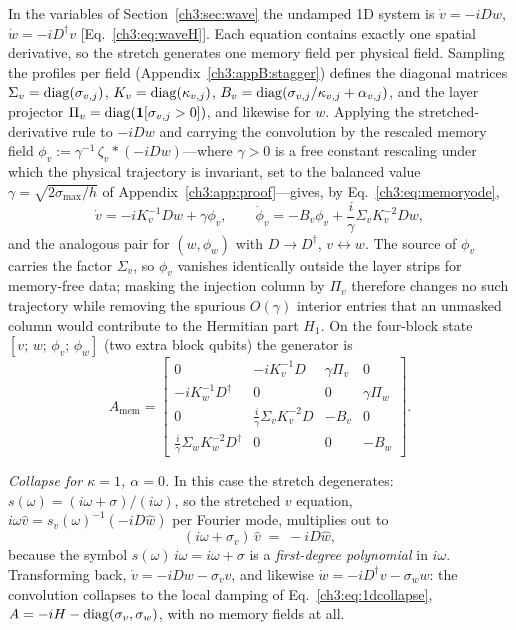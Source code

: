 In the variables of Section~\ref{ch3:sec:wave} the undamped 1D system is
$\dot v=-iDw$, $\dot w=-iD^{\dagger}v$ [Eq.~\eqref{ch3:eq:waveH}].  Each
equation contains exactly one spatial derivative, so the stretch
generates one memory field per physical field.  Sampling the profiles
per field (Appendix~\ref{ch3:appB:stagger}) defines the diagonal matrices
$\Sigma_v=\operatorname{diag}(\sigma_{v,j})$, $K_v=\operatorname{diag}(\kappa_{v,j})$,
$B_v=\operatorname{diag}(\sigma_{v,j}/\kappa_{v,j}+\alpha_{v,j})$, and the layer
projector $\Pi_v=\operatorname{diag}(\mathbf{1}[\sigma_{v,j}>0])$, and likewise for
$w$.  Applying the stretched-derivative rule to $-iDw$ and carrying the
convolution by the rescaled memory field
$\phi_v:=\gamma^{-1}\,\zeta_v*(-iDw)$---where $\gamma>0$ is a free
constant rescaling under which the physical trajectory is invariant,
set to the balanced value $\gamma=\sqrt{2\sigma_{\max}/h}$ of
Appendix~\ref{ch3:app:proof}---gives, by Eq.~\eqref{ch3:eq:memoryode},
\begin{equation}
  \dot v = -iK_v^{-1}Dw + \gamma\phi_v,
  \qquad
  \dot\phi_v = -B_v\phi_v + \frac{i}{\gamma}\Sigma_vK_v^{-2}Dw,
  \label{ch3:appB:eq:stretched}
\end{equation}
and the analogous pair for $(w,\phi_w)$ with $D\to D^{\dagger}$,
$v\leftrightarrow w$.  The source of $\phi_v$ carries the factor
$\Sigma_v$, so $\phi_v$ vanishes identically outside the layer strips
for memory-free data; masking the injection column by $\Pi_v$ therefore
changes no such trajectory while removing the spurious $O(\gamma)$
interior entries that an unmasked column would contribute to the
Hermitian part $H_1$.  On the four-block state
$[v;\,w;\,\phi_v;\,\phi_w]$ (two extra block qubits) the generator is
\begin{equation}
  A_{\mathrm{mem}} =
  \begin{bmatrix}
    0 & -iK_v^{-1}D & \gamma\Pi_v & 0\\[2pt]
    -iK_w^{-1}D^{\dagger} & 0 & 0 & \gamma\Pi_w\\[2pt]
    0 & \tfrac{i}{\gamma}\Sigma_vK_v^{-2}D & -B_v & 0\\[2pt]
    \tfrac{i}{\gamma}\Sigma_wK_w^{-2}D^{\dagger} & 0 & 0 & -B_w
  \end{bmatrix}.
  \label{ch3:appB:eq:gen1d}
\end{equation}

\emph{Collapse for $\kappa=1$, $\alpha=0$.}  In this case the stretch
degenerates: $s(\omega)=(i\omega+\sigma)/(i\omega)$, so the stretched
$v$ equation, $i\omega\hat v=s_v(\omega)^{-1}(-iD\hat w)$ per Fourier
mode, multiplies out to
\begin{equation}
  (i\omega+\sigma_v)\,\hat v \;=\; -iD\hat w,
  \label{ch3:appB:eq:freqcollapse}
\end{equation}
because the symbol $s(\omega)\,i\omega=i\omega+\sigma$ is a
\emph{first-degree polynomial} in $i\omega$.  Transforming back,
$\dot v=-iDw-\sigma_v v$, and likewise
$\dot w=-iD^{\dagger}v-\sigma_w w$: the convolution collapses to the
local damping of Eq.~\eqref{ch3:eq:1dcollapse},
$A=-iH-\operatorname{diag}(\sigma_v,\sigma_w)$, with no memory fields at all.

